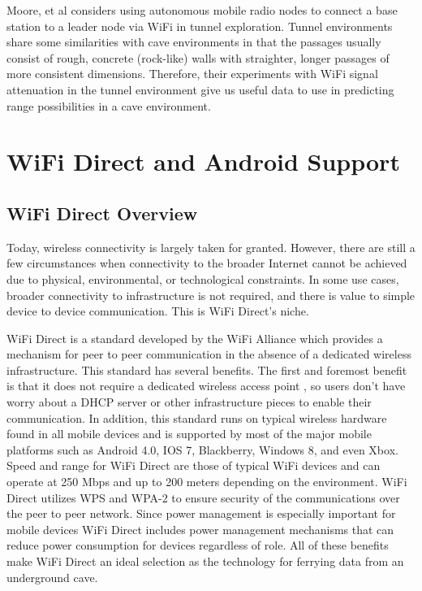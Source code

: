 \documentclass[10pt,twocolumn]{article}
\begin{document}
Moore, et al \cite{moore2012} considers using autonomous mobile radio nodes to connect a base station to a leader node via WiFi in tunnel exploration. 
Tunnel environments share some similarities with cave environments in that the passages usually consist of rough, concrete (rock-like) walls with straighter, longer passages of more consistent dimensions. 
Therefore, their experiments with WiFi signal attenuation in the tunnel environment give us useful data to use in predicting range possibilities in a cave environment.

\section{WiFi Direct and Android Support}

\subsection{WiFi Direct Overview}
\label{sec:WiFiD Overview}
Today, wireless connectivity is largely taken for granted. 
However, there are still a few circumstances when connectivity to the broader Internet cannot be achieved due to physical, environmental, or technological constraints.
In some use cases, broader connectivity to infrastructure is not required, and there is value to simple device to device communication. 
This is WiFi Direct's niche.

WiFi Direct is a standard developed by the WiFi Alliance which provides a mechanism for peer to peer communication in the absence of a dedicated wireless infrastructure. 
This standard has several benefits.
The first and foremost benefit is that it does not require a dedicated wireless access point \cite{whywifid}, so users don't have worry about a DHCP server or other infrastructure pieces to enable their communication. 
In addition, this standard runs on typical wireless hardware found in all mobile devices and is supported by most of the major mobile platforms such as Android 4.0, IOS 7, Blackberry, Windows 8, and even Xbox. 
Speed and range for WiFi Direct are those of typical WiFi devices and can operate at 250 Mbps and up to 200 meters depending on the environment. 
WiFi Direct utilizes WPS and WPA-2 to ensure security of the communications over the peer to peer network. 
Since power management is especially important for mobile devices WiFi Direct includes power management mechanisms that can reduce power consumption for devices regardless of role.
All of these benefits make WiFi Direct an ideal selection as the technology for ferrying data from an underground cave.
\end{document}
